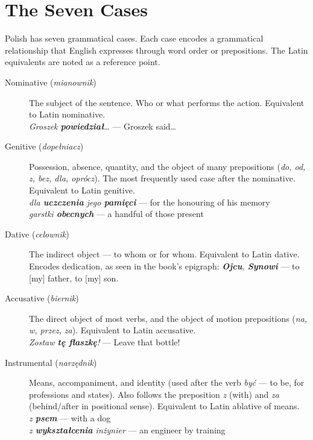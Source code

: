 \section{The Seven Cases}

Polish has seven grammatical cases. Each case encodes a grammatical 
relationship that English expresses through word order or prepositions. 
The Latin equivalents are noted as a reference point.

\begin{description}

  \item[Nominative (\textit{mianownik})] The subject of the sentence. 
    Who or what performs the action. Equivalent to Latin nominative.\\
    \textit{Groszek \textbf{powiedział}\ldots} — Groszek said\ldots

  \item[Genitive (\textit{dopełniacz})] Possession, absence, quantity, 
    and the object of many prepositions (\textit{do, od, z, bez, dla, oprócz}). 
    The most frequently used case after the nominative. Equivalent to Latin genitive.\\
    \textit{dla \textbf{uczczenia} jego \textbf{pamięci}} — for the honouring of his memory\\
    \textit{garstki \textbf{obecnych}} — a handful of those present

  \item[Dative (\textit{celownik})] The indirect object — to whom or for whom. 
    Equivalent to Latin dative. Encodes dedication, as seen in the book's 
    epigraph: \textit{\textbf{Ojcu}, \textbf{Synowi}} — to [my] father, to [my] son.

  \item[Accusative (\textit{biernik})] The direct object of most verbs, 
    and the object of motion prepositions (\textit{na, w, przez, za}).
    Equivalent to Latin accusative.\\
    \textit{Zostaw \textbf{tę flaszkę}!} — Leave that bottle!

  \item[Instrumental (\textit{narzędnik})] Means, accompaniment, and 
    identity (used after the verb \textit{być} — to be, for professions 
    and states). Also follows the preposition \textit{z} (with) and \textit{za} 
    (behind/after in positional sense). Equivalent to Latin ablative of means.\\
    \textit{z \textbf{psem}} — with a dog\\
    \textit{z \textbf{wykształcenia} inżynier} — an engineer by training


\end{description}
